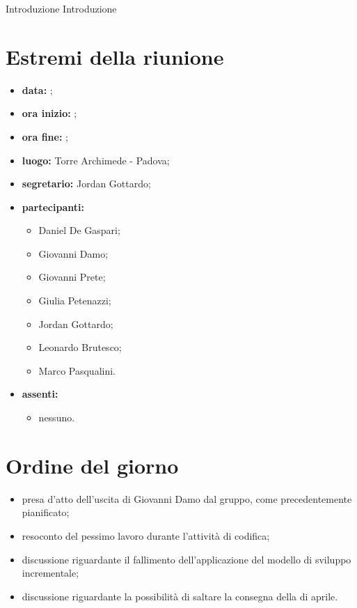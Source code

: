 \documentclass[a4paper,11pt]{article}
\begin{document}
	Introduzione
	Introduzione

	\section{Estremi della riunione}
	\begin{itemize}
		\item \textbf{data:} ;
		\item \textbf{ora inizio:} ;
		\item \textbf{ora fine:} ;
		\item \textbf{luogo:} Torre Archimede - Padova;
		\item \textbf{segretario:} Jordan Gottardo;
		\item \textbf{partecipanti:}
			\begin{itemize}
				\item Daniel De Gaspari;
				\item Giovanni Damo;
				\item Giovanni Prete;
				\item Giulia Petenazzi;
				\item Jordan Gottardo;
				\item Leonardo Brutesco;
				\item Marco Pasqualini.
			\end{itemize}
		\item \textbf{assenti:}
			\begin{itemize}
				\item nessuno.
			\end{itemize}
	\end{itemize}
	\section{Ordine del giorno}
		\begin{itemize}
			\item presa d'atto dell'uscita di Giovanni Damo dal gruppo, come precedentemente pianificato;
			\item resoconto del pessimo lavoro durante l'attività di codifica;
			\item discussione riguardante il fallimento dell'applicazione del modello di sviluppo incrementale;
			\item discussione riguardante la possibilità di saltare la consegna della \revaqual{} di aprile.
		\end{itemize}
\end{document}
